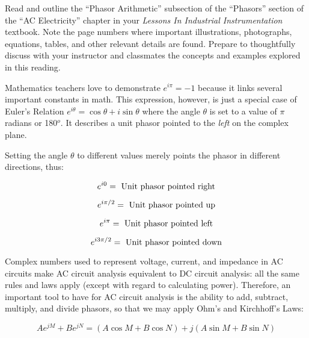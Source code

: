 

Read and outline the ``Phasor Arithmetic'' subsection of the ``Phasors'' section of the ``AC Electricity'' chapter in your {\it Lessons In Industrial Instrumentation} textbook.  Note the page numbers where important illustrations, photographs, equations, tables, and other relevant details are found.  Prepare to thoughtfully discuss with your instructor and classmates the concepts and examples explored in this reading.













Mathematics teachers love to demonstrate $e^{i \pi} = -1$ because it links several important constants in math.  This expression, however, is just a special case of Euler's Relation $e^{i \theta} = \cos \theta + i \sin \theta$ where the angle $\theta$ is set to a value of $\pi$ radians or 180$^{o}$.  It describes a unit phasor pointed to the {\it left} on the complex plane.

\vskip 10pt

Setting the angle $\theta$ to different values merely points the phasor in different directions, thus:

$$e^{i0} = \hbox{ Unit phasor pointed right}$$

$$e^{i \pi / 2} = \hbox{ Unit phasor pointed up}$$

$$e^{i \pi} = \hbox{ Unit phasor pointed left}$$

$$e^{i 3 \pi / 2} = \hbox{ Unit phasor pointed down}$$

Complex numbers used to represent voltage, current, and impedance in AC circuits make AC circuit analysis equivalent to DC circuit analysis: all the same rules and laws apply (except with regard to calculating power).  Therefore, an important tool to have for AC circuit analysis is the ability to add, subtract, multiply, and divide phasors, so that we may apply Ohm's and Kirchhoff's Laws:

$$Ae^{jM} + Be^{jN} = (A \cos M + B \cos N) + j (A \sin M + B \sin N)$$

